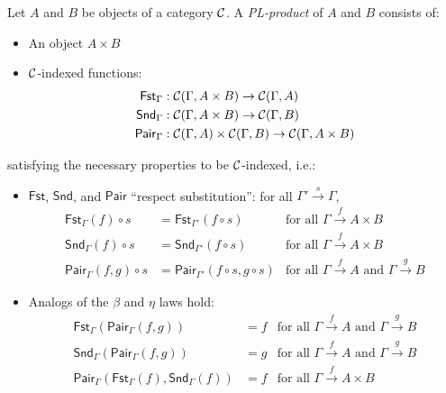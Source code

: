 \begin{definition}[PL-product]
  \sloppy
  Let \(A\) and \(B\) be objects of a category \(\mathcal C\).
  A \emph{PL-product} of \(A\) and \(B\) consists of:
  \begin{itemize}
  \item An object \(A \times B\)
  \item $\mathcal C$-indexed functions:
    \begin{align*}
      \mathsf{Fst}_\Gamma &: \mathcal C(\Gamma,A\times B) \to \mathcal C(\Gamma,A) \\
      \mathsf{Snd}_\Gamma &: \mathcal C(\Gamma,A\times B) \to \mathcal C(\Gamma,B) \\
      \mathsf{Pair}_\Gamma &: \mathcal C(\Gamma,A)\times\mathcal C(\Gamma,B) \to \mathcal C(\Gamma,A\times B)
    \end{align*}
  \end{itemize}
  satisfying the necessary properties to be $\mathcal C$-indexed, i.e.:
  \begin{itemize}
  \item \(\mathsf{Fst}\), \(\mathsf{Snd}\), and \(\mathsf{Pair}\) ``respect substitution'': for all
    \(\Gamma'\xrightarrow{s}\Gamma\),
    \begin{align*}
      \mathsf{Fst}_{\Gamma}(f)\circ s &= \mathsf{Fst}_{\Gamma'}(f \circ s) & \text{for all \(\Gamma\xrightarrow{f} A \times B\)} \\
      \mathsf{Snd}_{\Gamma}(f)\circ s &= \mathsf{Snd}_{\Gamma'}(f \circ s) & \text{for all \(\Gamma\xrightarrow{f} A \times B\)} \\
      \mathsf{Pair}_{\Gamma}(f,g)\circ s &= \mathsf{Pair}_{\Gamma'}(f \circ s,g\circ s) & \text{for all \(\Gamma\xrightarrow{f} A\) and \(\Gamma\xrightarrow{g} B\)}
    \end{align*}
  \item Analogs of the \(\beta\) and \(\eta\) laws hold:
    \begin{align*}
      \mathsf{Fst}_{\Gamma}(\mathsf{Pair}_{\Gamma}(f,g)) &= f   & \text{for all \(\Gamma\xrightarrow{f} A\) and \(\Gamma\xrightarrow{g} B\)} \\
      \mathsf{Snd}_{\Gamma}(\mathsf{Pair}_{\Gamma}(f,g)) &= g   & \text{for all \(\Gamma\xrightarrow{f} A\) and \(\Gamma\xrightarrow{g} B\)} \\
      \mathsf{Pair}_\Gamma(\mathsf{Fst}_\Gamma(f),\mathsf{Snd}_\Gamma(f)) &= f   & \text{for all \(\Gamma\xrightarrow{f} A\times B\)}
    \end{align*}
  \end{itemize}
\end{definition}
